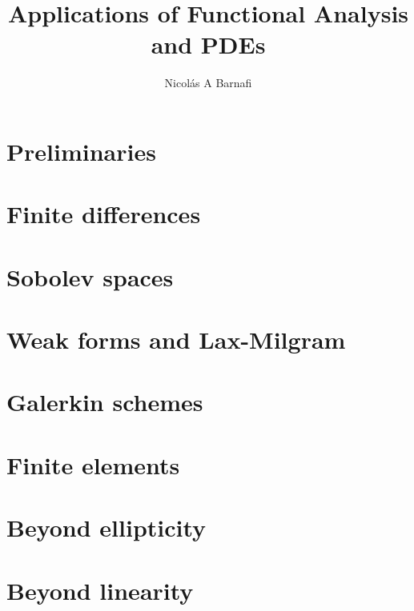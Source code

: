 \documentclass{scrbook}
\title{Applications of Functional Analysis and PDEs}
\author{Nicol\'as A Barnafi}
\date{} %
\begin{document}
\maketitle
\tableofcontents
\mainmatter



\chapter{Preliminaries}\label{chapter:preliminaries}

\chapter{Finite differences}\label{chapter:finite-differences}

\chapter{Sobolev spaces}\label{chapter:sobolev}

\chapter{Weak forms and Lax-Milgram}\label{chapter:weak-forms-lax-milgram}

\chapter{Galerkin schemes}\label{chapter:galerkin}

\chapter{Finite elements}\label{chapter:fem}

\chapter{Beyond ellipticity}\label{chapter:beyond-ellipticity}

\chapter{Beyond linearity}\label{chapter:nonlinear}

\end{document}
